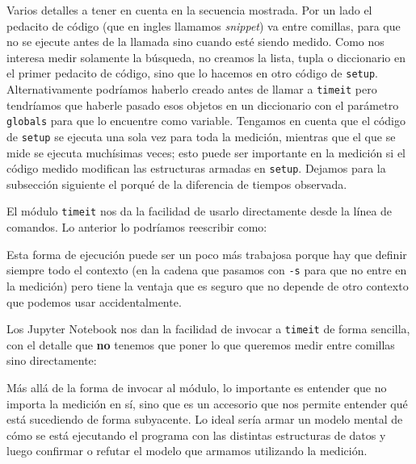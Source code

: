 Varios detalles a tener en cuenta en la secuencia mostrada. Por un lado el pedacito de código (que en ingles llamamos \textit{snippet}) va entre comillas, para que no se ejecute antes de la llamada sino cuando esté siendo medido. Como nos interesa medir solamente la búsqueda, no creamos la lista, tupla o diccionario en el primer pedacito de código, sino que lo hacemos en otro código de \texttt{setup}. Alternativamente podríamos haberlo creado antes de llamar a \texttt{timeit} pero tendríamos que haberle pasado esos objetos en un diccionario con el parámetro \texttt{globals} para que lo encuentre como variable. Tengamos en cuenta que el código de \texttt{setup} se ejecuta una sola vez para toda la medición, mientras que el que se mide se ejecuta muchísimas veces; esto puede ser importante en la medición si el código medido modifican las estructuras armadas en \texttt{setup}. Dejamos para la subsección siguiente el porqué de la diferencia de tiempos observada.

El módulo \texttt{timeit} nos da la facilidad de usarlo directamente desde la línea de comandos. Lo anterior lo podríamos reescribir como:


Esta forma de ejecución puede ser un poco más trabajosa porque hay que definir siempre todo el contexto (en la cadena que pasamos con \texttt{-s} para que no entre en la medición) pero tiene la ventaja que es seguro que no depende de otro contexto que podemos usar accidentalmente.

Los Jupyter Notebook nos dan la facilidad de invocar a \texttt{timeit} de forma sencilla, con el detalle que \textbf{no} tenemos que poner lo que queremos medir entre comillas sino directamente:


Más allá de la forma de invocar al módulo, lo importante es entender que no importa la medición en sí, sino que es un accesorio que nos permite entender qué está sucediendo de forma subyacente. Lo ideal sería armar un modelo mental de cómo se está ejecutando el programa con las distintas estructuras de datos y luego confirmar o refutar el modelo que armamos utilizando la medición. 


